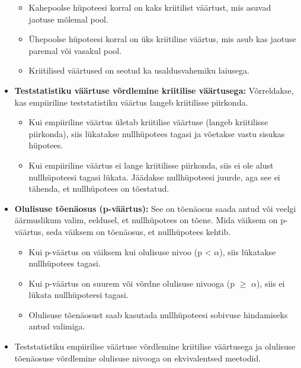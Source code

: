 \documentclass[
]{book}
\providecommand{\tightlist}{%
  \setlength{\itemsep}{0pt}\setlength{\parskip}{0pt}}
\begin{document}
\begin{itemize}
  \begin{itemize}
  \tightlist
  \item
    Kahepoolse hüpoteesi korral on kaks kriitilist väärtust, mis asuvad jaotuse mõlemal pool.
  \item
    Ühepoolse hüpoteesi korral on üks kriitiline väärtus, mis asub kas jaotuse paremal või vasakul pool.
  \item
    Kriitilised väärtused on seotud ka usaldusvahemiku laiusega.
  \end{itemize}
\item
  \textbf{Teststatistiku väärtuse võrdlemine kriitilise väärtusega:} Võrreldakse, kas empiiriline teststatistiku väärtus langeb kriitilisse piirkonda.

  \begin{itemize}
  \tightlist
  \item
    Kui empiiriline väärtus ületab kriitilise väärtuse (langeb kriitilisse piirkonda), siis lükatakse nullhüpotees tagasi ja võetakse vastu sisukas hüpotees.
  \item
    Kui empiiriline väärtus ei lange kriitilisse piirkonda, siis ei ole alust nullhüpoteesi tagasi lükata. Jäädakse nullhüpoteesi juurde, aga see ei tähenda, et nullhüpotees on tõestatud.
  \end{itemize}
\item
  \textbf{Olulisuse tõenäosus (p-väärtus):} See on tõenäosus saada antud või veelgi äärmuslikum valim, eeldusel, et nullhüpotees on tõene. Mida väiksem on p-väärtus, seda väiksem on tõenäosus, et nullhüpotees kehtib.

  \begin{itemize}
  \tightlist
  \item
    Kui p-väärtus on väiksem kui olulisuse nivoo (p \textless{} \(\alpha\)), siis lükatakse nullhüpotees tagasi.
  \item
    Kui p-väärtus on suurem või võrdne olulisuse nivooga (p \(\ge\) \(\alpha\)), siis ei lükata nullhüpoteesi tagasi.
  \item
    Olulisuse tõenäosust saab kasutada nullhüpoteesi sobivuse hindamiseks antud valimiga.
  \end{itemize}
\item
  Teststatistiku empiirilise väärtuse võrdlemine kriitilise väärtusega ja olulisuse tõenäosuse võrdlemine olulisuse nivooga on ekvivalentsed meetodid.
\end{itemize}
\end{document}
